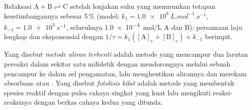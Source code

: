 \begin{omfigure}

{\small Relaksasi $\mathrm{A + B \rightleftharpoons C}$ setelah lonjakan suhu yang
menurunkan tetapan kesetimbangannya sebesar 5\,\% (model:
$k_1 = \qty{1.0e8}{L.mol^{-1}.s^{-1}}$, $k_{-1} = \qty{1.0e3}{s^{-1}}$, seluruhnya
\qty{1.0e-4}{mol/L} A dan B): persamaan laju lengkap dan eksponensial dengan
$1/\tau = k_1([\mathrm A]_e + [\mathrm B]_e) + k_{-1}$ berimpit.}
\end{omfigure}

\begin{definition}\label{def:b3:complex-kinetics:fast}
Yang disebut \emph{metode aliran terhenti} adalah
metode yang mencampur dua larutan pereaksi dalam sekitar satu milidetik
dengan mendorongnya melalui sebuah pencampur ke dalam sel pengamatan, lalu
menghentikan alirannya dan merekam absorbans atau . Yang
disebut \emph{fotolisis kilat} adalah metode yang
membentuk spesies reaktif dengan pulsa cahaya singkat yang kuat lalu
mengikuti reaksi-reaksinya dengan berkas cahaya kedua yang ditunda.
\end{definition}

